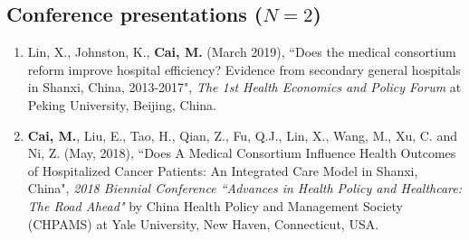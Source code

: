 \documentclass[11pt, a4paper]{article}
\newcommand{\years}[1]{\marginnote{\scriptsize #1}}
\begin{document}
	\subsection*{Conference presentations ($N=2$)}
	\begin{enumerate}[leftmargin=0ex,itemsep=1ex]
		\item \years{2019}Lin, X., Johnston, K., \textbf{Cai, M.} (March 2019), ``Does the medical consortium reform improve hospital efficiency? Evidence from secondary general hospitals in Shanxi, China, 2013-2017", \emph{The 1st Health Economics and Policy Forum} at Peking University, Beijing, China.
		
		\item \years{2018}\textbf{Cai, M.}, Liu, E., Tao, H., Qian, Z., Fu, Q.J., Lin, X., Wang, M., Xu, C. and Ni, Z. (May, 2018), ``Does A Medical Consortium Influence Health Outcomes of Hospitalized Cancer Patients: An Integrated Care Model in Shanxi, China", \emph{2018 Biennial Conference ``Advances in Health Policy and Healthcare: The Road Ahead"} by China Health Policy and Management Society (CHPAMS) at Yale University, New Haven, Connecticut, USA.
	\end{enumerate}
	
\end{document}
